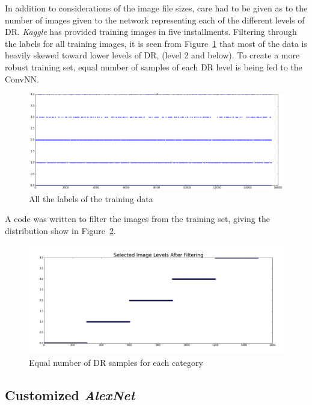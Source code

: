 \documentclass[letterpaper,12pt]{article}
\newcommand{\figref}[1]{Figure~\ref{#1}}
\begin{document}
In addition to considerations of the image file sizes, care had to be given as to the number of images given to the network representing each of the different levels of DR. \textit{Kaggle} has provided training images in five installments. Filtering through the labels for all training images, it is seen from \figref{fullSample} that most of the data is heavily skewed toward lower levels of DR, (level 2 and below). To create a more robust training set, equal number of samples of each DR level is being fed to the ConvNN. 

\begin{figure}[htbp]
\begin{center}
\includegraphics[scale=0.25]{images/FullSample.png}
\caption{All the labels of the training data}
\label{fullSample}
\end{center}
\end{figure}

A code was written to filter the images from the training set, giving the distribution show in \figref{filtered}.

\begin{figure}[htbp]
\begin{center}
\includegraphics[scale=0.25]{images/After_filtering.png}
\caption{Equal number of DR samples for each category}
\label{filtered}
\end{center}
\end{figure}

\subsection{Customized \textit{AlexNet}}
\end{document}
